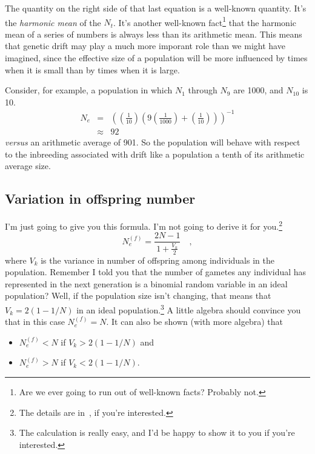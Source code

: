 \documentclass[12pt]{article}
\begin{document}
The quantity on the right side of that last equation is a well-known
quantity. It's the {\it harmonic mean} of the $N_{t}$.  It's another
well-known fact\footnote{Are we ever going to run out of well-known
  facts? Probably not.} that the harmonic mean of a series of numbers
is always less than its arithmetic mean. This means that genetic drift
may play a much more imporant role than we might have imagined, since
the effective size of a population will be more influenced by times
when it is small than by times when it is large.

Consider, for example, a population in which $N_1$ through $N_9$ are
1000, and $N_{10}$ is 10.
\begin{eqnarray*}
N_e &=& \left(\left(\frac{1}{10}\right)
            \left(9\left(\frac{1}{1000}\right) +
                   \left(\frac{1}{10}\right)\right)\right)^{-1} \\
    &\approx& 92
\end{eqnarray*}
{\it versus\/} an arithmetic average of 901. So the population will
behave with respect to the inbreeding associated with drift like a
population a tenth of its arithmetic average size.

\subsection*{Variation in offspring number}

I'm just going to give you this formula. I'm not going to derive it
for you.\footnote{The details are in~\cite{Crow-Kimura-1970}, if
  you're interested.}
\[
N_e^{(f)} = \frac{2N - 1}{1 + \frac{V_k}{2}} \quad ,
\]
where $V_k$ is the variance in number of offspring among individuals
in the population.  Remember I told you that the number of gametes any
individual has represented in the next generation is a binomial random
variable in an ideal population? Well, if the population size isn't
changing, that means that $V_k = 2(1 - 1/N)$ in an ideal
population.\footnote{The calculation is really easy, and I'd be happy
  to show it to you if you're interested.} A little algebra should
convince you that in this case $N_e^{(f)} = N$. It can also be shown
(with more algebra) that

\begin{itemize}

\item $N_e^{(f)} < N$ if $V_k > 2(1 - 1/N)$ and

\item $N_e^{(f)} > N$ if $V_k < 2(1 - 1/N)$.

\end{itemize}
\end{document}
